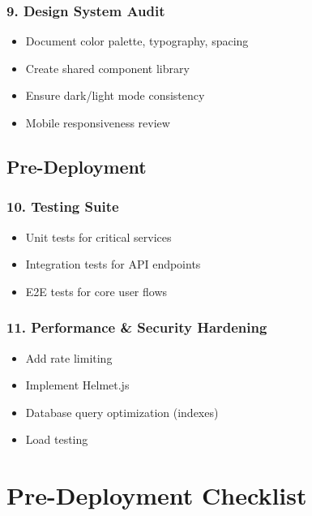 \documentclass[12pt,a4paper]{article}
\begin{document}
\subsubsection{9. Design System Audit}

\begin{itemize}
    \item Document color palette, typography, spacing
    \item Create shared component library
    \item Ensure dark/light mode consistency
    \item Mobile responsiveness review
\end{itemize}

\subsection{Pre-Deployment}

\subsubsection{10. Testing Suite}

\begin{itemize}
    \item Unit tests for critical services
    \item Integration tests for API endpoints
    \item E2E tests for core user flows
\end{itemize}

\subsubsection{11. Performance \& Security Hardening}

\begin{itemize}
    \item Add rate limiting
    \item Implement Helmet.js
    \item Database query optimization (indexes)
    \item Load testing
\end{itemize}

\section{Pre-Deployment Checklist}
\end{document}
